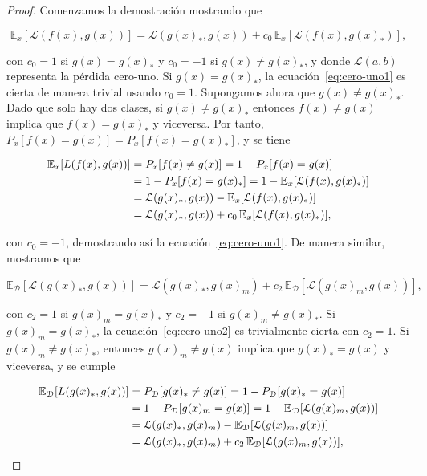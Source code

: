 \begin{proof}
    Comenzamos la demostración mostrando que

    \begin{equation}\label{eq:cero-uno1}
        \mathbb{E}_{x}[\mathcal{L}(f(x), g(x))] = \mathcal{L}(g(x)_*, g(x)) + c_0 \, \mathbb{E}_{x}[\mathcal{L}(f(x), g(x)_*)],
    \end{equation}

    con $c_0 = 1$ si $g(x) = g(x)_*$ y $c_0 = -1$ si $g(x) \neq g(x)_*$, y donde $\mathcal{L}(a, b)$ representa la pérdida cero-uno. Si $g(x) = g(x)_*$, la ecuación~\eqref{eq:cero-uno1} es cierta de manera trivial usando $c_0 = 1$. Supongamos ahora que $g(x) \neq g(x)_*$. Dado que solo hay dos clases, si $g(x) \neq g(x)_*$ entonces $f(x) \neq g(x)$ implica que $f(x) = g(x)_*$ y viceversa. Por tanto, $P_{x}[f(x) = g(x)] = P_{x}[f(x) = g(x)_*]$, y se tiene

    \begin{align}
        \mathbb{E}_x[L(f(x), g(x))] 
        &= P_{x}[f(x) \neq g(x)] \notag = 1 - P_{x}[f(x) = g(x)] \notag \\
        &= 1 - P_{x}[f(x) = g(x)_*] \notag = 1 - \mathbb{E}_{x}[\mathcal{L}(f(x), g(x)_*)] \notag \\
        &= \mathcal{L}(g(x)_*, g(x)) - \mathbb{E}_{x}[\mathcal{L}(f(x), g(x)_*)] \notag \\
        &= \mathcal{L}(g(x)_*, g(x)) + c_0 \, \mathbb{E}_{x}[\mathcal{L}(f(x), g(x)_*)],
    \end{align}        

    con $c_0 = -1$, demostrando así la ecuación~\eqref{eq:cero-uno1}. De manera similar, mostramos que

    \begin{equation}\label{eq:cero-uno2}
        \mathbb{E}_\mathcal{D}[\mathcal{L}(g(x)_*, g(x))] = \mathcal{L}(g(x)_*, g(x)_m) + c_2 \, \mathbb{E}_\mathcal{D}[\mathcal{L}(g(x)_m, g(x))],
    \end{equation}

    con $c_2 = 1$ si $g(x)_m = g(x)_*$ y $c_2 = -1$ si $g(x)_m \neq g(x)_*$. Si $g(x)_m = g(x)_*$, la ecuación~\eqref{eq:cero-uno2} es trivialmente cierta con $c_2 = 1$. Si $g(x)_m \neq g(x)_*$, entonces $g(x)_m \neq g(x)$ implica que $g(x)_* = g(x)$ y viceversa, y se cumple

    \begin{align}
        \mathbb{E}_\mathcal{D}[L(g(x)_*, g(x))]
        &= P_\mathcal{D}[g(x)_* \neq g(x)] = 1 - P_\mathcal{D}[g(x)_* = g(x)] \notag \\
        &= 1 - P_\mathcal{D}[g(x)_m = g(x)] = 1 - \mathbb{E}_\mathcal{D}[\mathcal{L}(g(x)_m, g(x))] \notag \\
        &= \mathcal{L}(g(x)_*, g(x)_m) - \mathbb{E}_\mathcal{D}[\mathcal{L}(g(x)_m, g(x))] \notag \\
        &= \mathcal{L}(g(x)_*, g(x)_m) + c_2 \, \mathbb{E}_\mathcal{D}[\mathcal{L}(g(x)_m, g(x))],
    \end{align}  


\end{proof}
